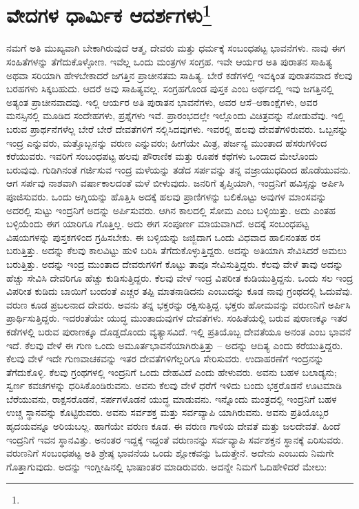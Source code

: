 
\chapter[ವೇದಗಳ ಧಾರ್ಮಿಕ ಆದರ್ಶಗಳು]{ವೇದಗಳ ಧಾರ್ಮಿಕ ಆದರ್ಶಗಳು\protect\footnote{}}

ನಮಗೆ ಅತಿ ಮುಖ್ಯವಾಗಿ ಬೇಕಾಗಿರುವುದೆ ಆತ್ಮ, ದೇವರು ಮತ್ತು ಧರ್ಮಕ್ಕೆ ಸಂಬಂಧಪಟ್ಟ ಭಾವನೆಗಳು. ನಾವು ಈಗ ಸಂಹಿತೆಗಳನ್ನು ತೆಗೆದುಕೊಳ್ಳೋಣ. ಇವೆಲ್ಲ ಒಂದು ಮಂತ್ರಗಳ ಸಂಗ್ರಹ. ಇವೇ ಆರ್ಯರ ಅತಿ ಪುರಾತನ ಸಾಹಿತ್ಯ ಅಥವಾ ಸರಿಯಾಗಿ ಹೇಳಬೇಕಾದರೆ ಜಗತ್ತಿನ ಪ್ರಾಚೀನತಮ ಸಾಹಿತ್ಯ. ಬೇರೆ ಕಡೆಗಳಲ್ಲಿ ಇವಕ್ಕಿಂತ ಪುರಾತನವಾದ ಕೆಲವು ಬರಹಗಳು ಸಿಕ್ಕಬಹುದು. ಆದರೆ ಅವು ಸಾಹಿತ್ಯವಲ್ಲ. ಸಂಗ್ರಹಗೊಂಡ ಪುಸ್ತಕ ಎಂಬ ಅರ್ಥದಲ್ಲಿ ಇವು ಜಗತ್ತಿನಲ್ಲಿ ಅತ್ಯಂತ ಪ್ರಾಚೀನವಾದವು. ಇಲ್ಲಿ ಆರ್ಯರ ಅತಿ ಪುರಾತನ ಭಾವನೆಗಳು, ಅವರ ಆಸೆ–ಆಕಾಂಕ್ಷೆಗಳು, ಅವರ ಮನಸ್ಸಿನಲ್ಲಿ ಮೂಡಿದ ಸಂದೇಹಗಳು, ಪ್ರಶ್ನೆಗಳು ಇವೆ. ಪ್ರಾರಂಭದಲ್ಲೇ ಇಲ್ಲೊಂದು ವಿಚಿತ್ರವನ್ನು ನೋಡುವೆವು. ಇಲ್ಲಿ ಬರುವ ಪ್ರಾರ್ಥನೆಗಳೆಲ್ಲ ಬೇರೆ ಬೇರೆ ದೇವತೆಗಳಿಗೆ ಸಲ್ಲಿಸಿದವುಗಳು. ಇವರಲ್ಲಿ ಹಲವು ದೇವತೆಗಳಿರುವರು. ಒಬ್ಬನನ್ನು ಇಂದ್ರ ಎನ್ನುವರು, ಮತ್ತೊಬ್ಬನನ್ನು ವರುಣ ಎನ್ನುವರು; ಹೀಗೆಯೇ ಮಿತ್ರ, ಪರ್ಜನ್ಯ ಮುಂತಾದ ಹೆಸರುಗಳಿಂದ ಕರೆಯುವರು. ಇವರಿಗೆ ಸಂಬಂಧಪಟ್ಟ ಹಲವು ಪೌರಾಣಿಕ ಮತ್ತು ರೂಪಕ ಕಥೆಗಳು ಒಂದಾದ ಮೇಲೊಂದು ಬರುವುವು. ಗುಡಿಗಿನಂತೆ ಗರ್ಜಿಸುವ ಇಂದ್ರ ಮಳೆಯನ್ನು ತಡೆದ ಸರ್ಪವನ್ನು ತನ್ನ ವಜ್ರಾಯುಧದಿಂದ ಹೊಡೆಯುವನು. ಆಗ ಸರ್ಪವು ನಾಶವಾಗಿ ವರ್ಷಾಕಾಲದಂತೆ ಮಳೆ ಬೀಳುವುದು. ಜನರಿಗೆ ತೃಪ್ತಿಯಾಗಿ, ಇಂದ್ರನಿಗೆ ಹವಿಸ್ಸನ್ನು ಅರ್ಪಿಸಿ ಪೂಜಿಸುವರು. ಒಂದು ಅಗ್ನಿಯನ್ನು ಹೊತ್ತಿಸಿ ಅದಕ್ಕೆ ಹಲವು ಪ್ರಾಣಿಗಳನ್ನು ಬಲಿಕೊಟ್ಟು ಅವುಗಳ ಮಾಂಸವನ್ನು ಅದರಲ್ಲಿ ಸುಟ್ಟು ಇಂದ್ರನಿಗೆ ಅದನ್ನು ಅರ್ಪಿಸುವರು. ಆಗಿನ ಕಾಲದಲ್ಲಿ ಸೋಮ ಎಂಬ ಬಳ್ಳಿಯಿತ್ತು. ಅದು ಎಂತಹ ಬಳ್ಳಿಯೆಂದು ಈಗ ಯಾರಿಗೂ ಗೊತ್ತಿಲ್ಲ. ಅದು ಈಗ ಸಂಪೂರ್ಣ ಮಾಯವಾಗಿದೆ. ಅದಕ್ಕೆ ಸಂಬಂಧಪಟ್ಟ ವಿಷಯಗಳನ್ನು ಪುಸ್ತಕಗಳಿಂದ ಗ್ರಹಿಸಬೇಕು. ಈ ಬಳ್ಳಿಯನ್ನು ಜಜ್ಜಿದಾಗ ಒಂದು ವಿಧವಾದ ಹಾಲಿನಂತಹ ರಸ ಬರುತ್ತಿತ್ತು. ಅದನ್ನು ಕೆಲವು ಕಾಲವಿಟ್ಟು ಹುಳಿ ಬರಿಸಿ ತೆಗೆದುಕೊಳ್ಳುತ್ತಿದ್ದರು. ಅದನ್ನು ಅತಿಯಾಗಿ ಸೇವಿಸಿದರೆ ಅಮಲು ಬರುತ್ತಿತ್ತು. ಅದನ್ನು ಇಂದ್ರ ಮುಂತಾದ ದೇವರುಗಳಿಗೆ ಕೊಟ್ಟು ತಾವೂ ಸೇವಿಸುತ್ತಿದ್ದರು. ಕೆಲವು ವೇಳೆ ತಾವು ಅದನ್ನು ಹೆಚ್ಚು ಸೇವಿಸಿ ದೇವರಿಗೂ ಹೆಚ್ಚು ಕುಡಿಸುತ್ತಿದ್ದರು. ಕೆಲವು ವೇಳೆ ಇಂದ್ರ ವಿಪರೀತ ಕುಡಿಯುತ್ತಿದ್ದನು. ಒಂದು ಸಲ ಇಂದ್ರ ವಿಪರೀತ ಕುಡಿದು ಬಾಯಿಗೆ ಬಂದಂತೆ ಎಚ್ಚರ ತಪ್ಪಿ ಮಾತನಾಡಿದನು ಎಂಬುದನ್ನು ಕೂಡ ನಾವು ಗ್ರಂಥದಲ್ಲಿ ಓದುವೆವು. ವರುಣ ಕೂಡ ಪ್ರಬಲನಾದ ದೇವರು. ಅವನು ತನ್ನ ಭಕ್ತರನ್ನು ರಕ್ಷಿಸುತ್ತಿದ್ದ. ಭಕ್ತರು ಹೋಮವನ್ನು ವರುಣನಿಗೆ ಅರ್ಪಿಸಿ ಪ್ರಾರ್ಥಿಸುತ್ತಿದ್ದರು. ಇದರಂತೆಯೇ ಯುದ್ಧ ಮುಂತಾದುವುಗಳ ದೇವತೆಗಳು. ಸಂಹಿತೆಯಲ್ಲಿ ಬರುವ ಪುರಾಣಕ್ಕೂ ಇತರ ಕಡೆಗಳಲ್ಲಿ ಬರುವ ಪುರಾಣಕ್ಕೂ ದೊಡ್ಡದೊಂದು ವ್ಯತ್ಯಾಸವಿದೆ. ಇಲ್ಲಿ ಪ್ರತಿಯೊಬ್ಬ ದೇವತೆಯೂ ಅನಂತ ಎಂಬ ಭಾವನೆ ಇದೆ. ಕೆಲವು ವೇಳೆ ಈ ಗುಣ ಒಂದು ಅಮೂರ್ತಭಾವನೆಯಾಗಿರುತ್ತಿತ್ತು – ಅದನ್ನು ಆದಿತ್ಯ ಎಂದು ಕರೆಯುತ್ತಿದ್ದರು. ಕೆಲವು ವೇಳೆ ಇದೇ ಗುಣವಾಚಕವನ್ನು ಇತರ ದೇವತೆಗಳಿಗೆಲ್ಲರಿಗೂ ಸೇರಿಸುವರು. ಉದಾಹರಣೆಗೆ ಇಂದ್ರನನ್ನು ತೆಗೆದುಕೊಳ್ಳಿ. ಕೆಲವು ಗ್ರಂಥಗಳಲ್ಲಿ ಇಂದ್ರನಿಗೆ ಒಂದು ದೇಹವಿದೆ ಎಂದು ಹೇಳುವರು. ಅವನು ಬಹಳ ಬಲಾಡ್ಯನು; ಸ್ವರ್ಣ ಕವಚಗಳನ್ನು ಧರಿಸಿಕೊಂಡಿರುವನು. ಅವನು ಕೆಲವು ವೇಳೆ ಧರೆಗೆ ಇಳಿದು ಬಂದು ಭಕ್ತರೊಡನೆ ಊಟಮಾಡಿ ಬೆರೆಯುವನು, ರಾಕ್ಷಸರೊಡನೆ, ಸರ್ಪಗಳೊಡನೆ ಯುದ್ಧ ಮಾಡುವನು. ಇನ್ನೊಂದು ಮಂತ್ರದಲ್ಲಿ ಇಂದ್ರನಿಗೆ ಬಹಳ ಉಚ್ಚ ಸ್ಥಾನವನ್ನು ಕೊಟ್ಟಿರುವರು. ಅವನು ಸರ್ವಶಕ್ತ ಮತ್ತು ಸರ್ವವ್ಯಾಪಿ ಯಾಗಿರುವನು. ಅವನು ಪ್ರತಿಯೊಬ್ಬರ ಹೃದಯವನ್ನೂ ಅರಿಯಬಲ್ಲ. ಹಾಗೆಯೇ ವರುಣ ಕೂಡ. ಈ ವರುಣ ಗಾಳಿಯ ದೇವತೆ ಮತ್ತು ಜಲದೇವತೆ. ಹಿಂದೆ ಇಂದ್ರನಿಗೆ ಇವನ ಸ್ಥಾನವಿತ್ತು. ಅನಂತರ ಇದ್ದಕ್ಕೆ ಇದ್ದಂತೆ ವರುಣನನ್ನು ಸರ್ವವ್ಯಾಪಿ ಸರ್ವಶಕ್ತನ ಸ್ಥಾನಕ್ಕೆ ಏರಿಸುವರು. ವರುಣನಿಗೆ ಸಂಬಂಧಪಟ್ಟ ಅತಿ ಶ್ರೇಷ್ಠ ಭಾವನೆಯ ಒಂದು ಶ್ಲೋಕವನ್ನು ಓದುತ್ತೇನೆ. ಅದೇನು ಎಂಬುದು ನಿಮಗೇ ಗೊತ್ತಾಗುವುದು. ಅದನ್ನು ಇಂಗ್ಲೀಷಿನಲ್ಲಿ ಭಾಷಾಂತರ ಮಾಡಿರುವರು. ಅದನ್ನೇ ನಿಮಗೆ ಓದಿಹೇಳಿದರೆ ಮೇಲು:

